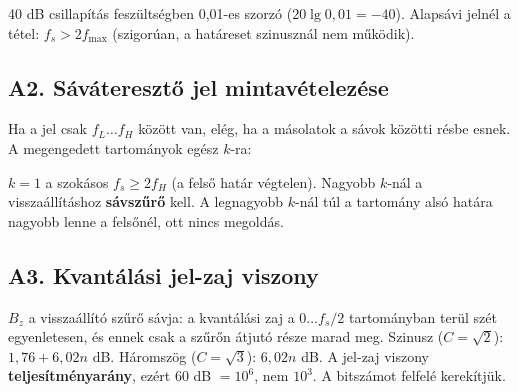 40 dB csillapítás feszültségben 0,01-es szorzó ($20\lg0{,}01=-40$). Alapsávi jelnél a tétel: $f_s>2f_{\max}$ (szigorúan, a határeset szinusznál nem működik).

\subsection{\texorpdfstring{A2. Sáváteresztő jel mintavételezése}{A2. Sáváteresztő jel mintavételezése}}\label{a2-sav}
Ha a jel csak $f_L\ldots f_H$ között van, elég, ha a másolatok a sávok közötti résbe esnek. A megengedett tartományok egész $k$-ra:

\begin{center}\end{center}

$k=1$ a szokásos $f_s\ge2f_H$ (a felső határ végtelen). Nagyobb $k$-nál a visszaállításhoz \textbf{sávszűrő} kell. A legnagyobb $k$-nál túl a tartomány alsó határa nagyobb lenne a felsőnél, ott nincs megoldás.

\subsection{\texorpdfstring{A3. Kvantálási jel-zaj viszony}{A3. Kvantálási jel-zaj viszony}}\label{a2-snr}
\begin{center}\end{center}

$B_z$ a visszaállító szűrő sávja: a kvantálási zaj a $0\ldots f_s/2$ tartományban terül szét egyenletesen, és ennek csak a szűrőn átjutó része marad meg. Szinusz ($C=\sqrt2$): $1{,}76+6{,}02n$ dB. Háromszög ($C=\sqrt3$): $6{,}02n$ dB. A jel-zaj viszony \textbf{teljesítményarány}, ezért 60 dB $=10^6$, nem $10^3$. A bitszámot felfelé kerekítjük.

